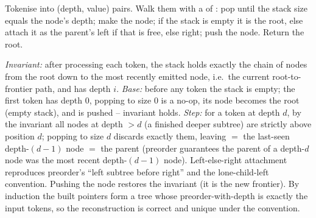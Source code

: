 Tokenise into (depth, value) pairs. Walk them with a  of : pop
until the stack size equals the node's depth; make the node; if the stack is empty it is
the root, else attach it as the parent's left if that is free, else right; push the node.
Return the root.

\begin{proofbox}
\emph{Invariant:} after processing each token, the stack holds exactly the chain of nodes from
the root down to the most recently emitted node, i.e.\ the current root-to-frontier path, and
 has depth $i$. \emph{Base:} before any token the stack is empty; the first token
has depth $0$, popping to size $0$ is a no-op, its node becomes the root (empty stack), and is
pushed -- invariant holds. \emph{Step:} for a token at depth $d$, by the invariant all nodes at
depth $> d$ (a finished deeper subtree) are strictly above position $d$; popping to size $d$
discards exactly them, leaving  $=$ the last-seen depth-$(d-1)$ node $=$ the
parent (preorder guarantees the parent of a depth-$d$ node was the most recent depth-$(d-1)$
node). Left-else-right attachment reproduces preorder's ``left subtree before right'' and the
lone-child-left convention. Pushing the node restores the invariant (it is the new frontier).
By induction the built pointers form a tree whose preorder-with-depth is exactly the input
tokens, so the reconstruction is correct and unique under the convention.
\end{proofbox}

